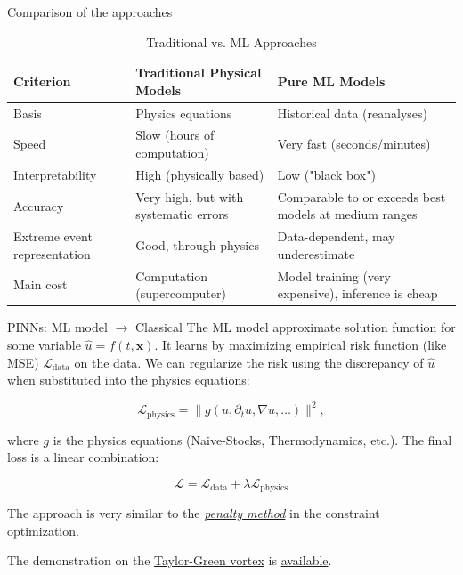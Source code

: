 \documentclass[10pt]{beamer}
\begin{document}
	\begin{frame}{Comparison of the approaches}
		
		\begin{table}[h]
			\centering
			\caption{Traditional vs. ML Approaches}
			\label{tab:comparison}
			\begin{tabular}{|p{}|p{0.3\textwidth}|p{}|}
				\hline
				\textbf{Criterion} & \textbf{Traditional Physical Models} & \textbf{Pure ML Models} \\
				\hline
				Basis & Physics equations & Historical data (reanalyses) \\
				\hline
				Speed & Slow (hours of computation) & Very fast (seconds/minutes) \\
				\hline
				Interpretability & High (physically based) & Low ("black box") \\
				\hline
				Accuracy & Very high, but with systematic errors & Comparable to or exceeds best models at medium ranges \\
				\hline
				Extreme event representation & Good, through physics & Data-dependent, may underestimate \\
				\hline
				Main cost & Computation (supercomputer) & Model training (very expensive), inference is cheap \\
				\hline
			\end{tabular}
		\end{table}
		
	\end{frame}
	
	\begin{frame}{PINNs: ML model $\to$ Classical}
		The ML model approximate solution function for some variable $\hat{u} = f(t, \boldsymbol{x})$. It learns by maximizing empirical risk function (like MSE) $\mathcal{L}_{\text{data}}$ on the data. We can regularize the risk using the discrepancy of $\hat{u}$ when substituted into the physics equations:
		
		\begin{equation*}
			\mathcal{L}_{\text{physics}} = \| g(u, \partial_t u, \nabla u, \ldots) \|^2 ,
		\end{equation*}
		
		where $g$ is the physics equations (Naive-Stocks, Thermodynamics, etc.). The final loss is a linear combination:
		
		\begin{equation}
			\mathcal{L} = \mathcal{L}_{\text{data}} + \lambda \mathcal{L}_{\text{physics}}
		\end{equation}
		
		The approach is very similar to the \href{https://en.wikipedia.org/wiki/Penalty_method}{\textit{penalty method}} in the constraint optimization.
		
		The demonstration on the \href{https://en.wikipedia.org/wiki/File:Lagrangian_trajectories_anumation_of_a_Taylor_Green_Vortex.gif}{Taylor-Green vortex} is \href{https://colab.research.google.com/drive/1UuzAmv43c6K9LmQ1cB4pSUPjrK1kqoHv?usp=sharing}{available}.
		
	\end{frame}
	
\end{document}
